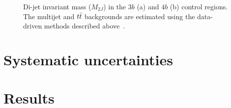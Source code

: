 \begin{figure}[h!]
   \caption{Di-jet invariant mass ($M_{2J}$) in the $3b$ (a) and $4b$ (b) control regions. The multijet and $t\bar{t}$ backgrounds are estimated using the data-driven methods described above~\cite{4bconf}.}
  \label{fig:4b_control}
\end{figure}


\section{Systematic uncertainties}

\section{Results}


